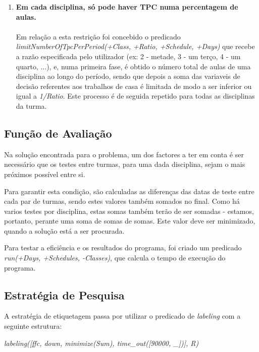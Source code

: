 \documentclass{llncs}
\begin{document}
\begin{enumerate}
	\item \textbf{Em cada disciplina, só pode haver TPC numa percentagem de aulas.} \\\\
		Em relação a esta restrição foi concebido o predicado  \textit{limitNumberOfTpcPerPeriod(+Class, +Ratio, +Schedule, +Days)} que recebe a razão especificada pelo utilizador (ex: 2 - metade, 3 - um terço, 4 - um 
		quarto, ...), e, numa primeira fase, é obtido o número total de aulas de uma disciplina ao longo do período, sendo que depois a soma das variaveis de decisão referentes aos trabalhos de casa é limitada de modo a ser 
		inferior ou igual a  \textit{1/Ratio}. Este processo é de seguida repetido para todas as disciplinas da turma.
	 	\\

	\end{enumerate}
		
	
	
 
 

\subsection{Função de Avaliação}
Na solução encontrada para o problema, um dos factores a ter em conta é ser necessário que os testes entre turmas, para uma dada disciplina, sejam o mais próximos possível entre si. \par
Para garantir esta condição, são calculadas as diferenças das datas de teste entre cada par de turmas, sendo estes valores também somados no final. Como há varios testes por disciplina, estas somas também terão de ser somadas - estamos, portanto, perante uma soma de somas de somas. Este valor deve ser minimizado, quando a solução está a ser procurada.\par
Para testar a eficiência e os resultados do programa, foi criado um predicado \textit{run(+Days, +Schedules, -Classes)}, que calcula o tempo de execução do programa.

\newpage
\subsection{Estratégia de Pesquisa}
A estratégia de etiquetagem passa por utilizar o predicado de \textit{labeling} com a seguinte estrutura:\newline\newline
\centerline{\textit{labeling([ffc, down, minimize(Sum), time\_out([90000, \_])], R)}}\newline
 
\end{document}
